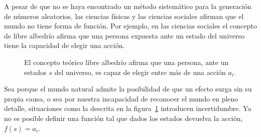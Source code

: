 \documentclass[a4paper,10pt]{book}
\begin{document}
A pesar de que no se haya encontrado un método sistemático para la generación de números aleatorios, las ciencias físicas y las ciencias sociales afirman que el mundo no tiene forma de función.
Por ejemplo, en las ciencias sociales el concepto de libre albedrío afirma que una persona expuesta ante un estado del universo tiene la capacidad de elegir una acción.
\begin{figure}[ht!]
\centering
    \caption{El concepto teórico libre albedrío afirma que una persona, ante un estados $s$ del universo, es capaz de elegir entre más de una acción $a_i$.}
    \label{fig:libre_albedrio}
\end{figure}
Sea porque el mundo natural admite la posibilidad de que un efecto surga sin su propia causa, o sea por nuestra incapacidad de reconocer el mundo en pleno detalle, situaciones como la descrita en la figura~\ref{fig:libre_albedrio} introducen incertidumbre.
Ya no es posible definir una función tal que dados los estados devuelva la acción, $f(s) = a_i$.

\end{document}
